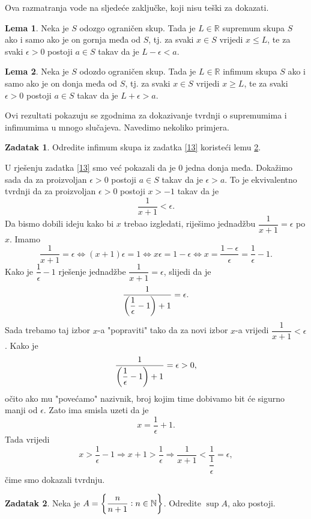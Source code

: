 \documentclass{book}
\let\originalleft\left
\let\originalright\right
\renewcommand{\left}{\mathopen{}\mathclose\bgroup\originalleft}
\renewcommand{\right}{\aftergroup\egroup\originalright}
\renewenvironment{proof}{%
    \vspace{-\parskip}\begin{oldproof}%
    }{%
    \end{oldproof}%
}
\theoremstyle{definition}
\newtheorem{lemma}{Lema}
\theoremstyle{definition}
\newtheorem{exercise}{Zadatak}
\theoremstyle{remark}
\begin{document}
Ova razmatranja vode na sljedeće zaključke, koji nisu teški za dokazati.
\begin{lemma}
\label{14}
Neka je $S$ odozgo ograničen skup. Tada je $L\in \mathbb{R}$ supremum skupa $S$ ako i samo ako je on gornja međa od $S$, tj. za svaki $x\in S$ vrijedi $x\leq L$, te za svaki $\epsilon >0$ postoji $a\in S$ takav da je $L-\epsilon<a$.
\end{lemma}
\begin{lemma}
\label{26}
Neka je $S$ odozdo ograničen skup. Tada je $L\in \mathbb{R}$ infimum skupa $S$ ako i samo ako je on donja međa od $S$, tj. za svaki $x\in S$ vrijedi $x\geq L$, te za svaki $\epsilon >0$ postoji $a\in S$ takav da je $L+\epsilon>a$.
\end{lemma}
Ovi rezultati pokazuju se zgodnima za dokazivanje tvrdnji o supremumima i infimumima u mnogo slučajeva. Navedimo nekoliko primjera.
\begin{exercise}
Odredite infimum skupa iz zadatka \ref{13} koristeći lemu \ref{26}.
\end{exercise}
\begin{proof}[Rješenje]
U rješenju zadatka \ref{13} smo već pokazali da je $0$ jedna donja međa. Dokažimo sada da za proizvoljan $\epsilon>0$ postoji $a\in S$ takav da je $\epsilon>a$. To je ekvivalentno tvrdnji da za proizvoljan $\epsilon>0$ postoji $x>-1$ takav da je $$\dfrac{1}{x+1}<\epsilon.$$ Da bismo dobili ideju kako bi $x$ trebao izgledati, riješimo jednadžbu $\dfrac{1}{x+1}=\epsilon$ po $x$. Imamo
$$\dfrac{1}{x+1}=\epsilon \Leftrightarrow (x+1)\epsilon=1\Leftrightarrow x\epsilon=1-\epsilon\Leftrightarrow x=\dfrac{1-\epsilon}{\epsilon}=\dfrac{1}{\epsilon}-1.$$
Kako je $\dfrac{1}{\epsilon}-1$ rješenje jednadžbe $\dfrac{1}{x+1}=\epsilon$, slijedi da je $$\dfrac{1}{\left(\dfrac{1}{\epsilon}-1\right)+1}=\epsilon.$$ Sada trebamo taj izbor $x$-a "popraviti" tako da za novi izbor $x$-a vrijedi $\dfrac{1}{x+1}<\epsilon$. Kako je $$\dfrac{1}{\left(\dfrac{1}{\epsilon}-1\right)+1}=\epsilon>0,$$ očito ako mu "povećamo" nazivnik, broj kojim time dobivamo bit će sigurno manji od $\epsilon$. Zato ima smisla uzeti da je $$x=\dfrac{1}{\epsilon}+1.$$ Tada vrijedi
$$x>\dfrac{1}{\epsilon}-1\Rightarrow x+1>\dfrac{1}{\epsilon}\Rightarrow \dfrac{1}{x+1}<\dfrac{1}{\dfrac{1}{\epsilon}}=\epsilon,$$
čime smo dokazali tvrdnju.
\end{proof}
\begin{exercise}
Neka je $A=\left\{\dfrac{n}{n+1} : n\in \mathbb{N}\right\}$. Odredite $\sup{A}$, ako postoji.
\end{exercise}
\end{document}

